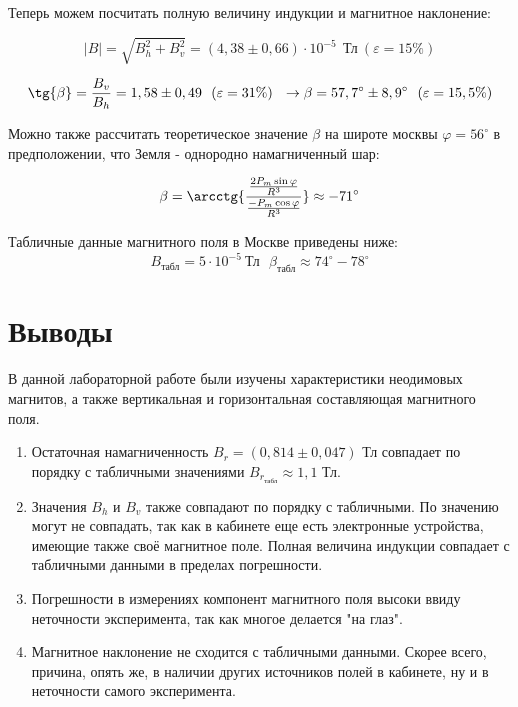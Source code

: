 \documentclass[a4paper, 12pt]{article}
\begin{document}
	Теперь можем посчитать полную величину индукции и магнитное наклонение:
	
	\[|B| = \sqrt{B_h^2 + B_v^2} = (4,38 \pm 0,66) \cdot 10^{-5} \ \ \text{Тл} \ (\varepsilon = 15\%) \]
	
	\[\tg{\beta} = \frac{B_v}{B_h} = 1,58 \pm 0,49 \ \ (\varepsilon = 31\%)\ \ \rightarrow \beta = 57,7^{\circ} \pm 8,9^{\circ} \ \ (\varepsilon = 15,5\%)\]
	
		Можно также рассчитать теоретическое значение $\beta$ на широте москвы $\varphi = 56^{\circ}$ в предположении, что Земля - однородно намагниченный шар:
	
	\[\beta = \arcctg{\frac{\frac{2P_m \sin{\varphi}}{R^3}}{\frac{-P_m \cos{\varphi}}{R^3}}} \approx -71^{\circ}\]
	
	Табличные данные магнитного поля в Москве приведены ниже:
	\[B_{\text{табл}} = 5 \cdot 10^{-5} \ \text{Тл} \ \ \ \beta_{\text{табл}} \approx 74^{\circ} - 78^{\circ}\]
	
	\section*{Выводы}
	В данной лабораторной работе были изучены характеристики неодимовых магнитов, а также вертикальная и горизонтальная составляющая магнитного поля. \\
	\begin{enumerate}
		\item Остаточная намагниченность $B_r = (0,814 \pm 0,047)$ Тл совпадает по порядку с табличными значениями $B_{r_{\text{табл}}} \approx 1,1$ Тл.
		\item Значения $B_h$ и $B_v$ также совпадают по порядку с табличными. По значению могут не совпадать, так как в кабинете еще есть электронные устройства, имеющие также своё магнитное поле. Полная величина индукции совпадает с табличными данными в пределах погрешности.
		\item Погрешности в измерениях компонент магнитного поля высоки ввиду неточности эксперимента, так как многое делается "на глаз".
		\item Магнитное наклонение не сходится с табличными данными. Скорее всего, причина, опять же, в наличии других источников полей в кабинете, ну и в неточности самого эксперимента.
	\end{enumerate}
	
	
\end{document}
